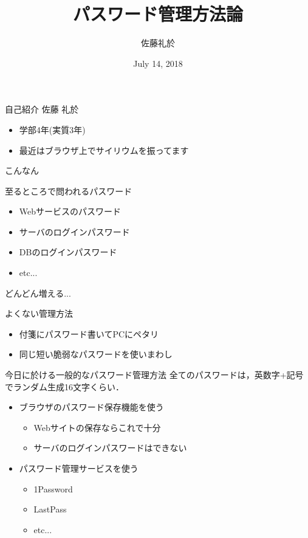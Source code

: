\documentclass{beamer}
\title{パスワード管理方法論}
\author{佐藤礼於}
\date{July 14, 2018}
\begin{document}
\frame{\maketitle}

\begin{frame}{自己紹介}
  \centering \Large 佐藤 礼於

  \begin{itemize}
    \item 学部4年(実質3年)
    \item 最近はブラウザ上でサイリウムを振ってます
  \end{itemize}
\end{frame}

\begin{frame}{こんなん}
\end{frame}


\begin{frame}{至るところで問われるパスワード}
  \begin{itemize}
    \item Webサービスのパスワード
    \item サーバのログインパスワード
    \item DBのログインパスワード
    \item etc...
  \end{itemize}

  どんどん増える...
\end{frame}

\begin{frame}{よくない管理方法}
  \begin{itemize}
    \item 付箋にパスワード書いてPCにペタリ
    \item 同じ短い脆弱なパスワードを使いまわし
  \end{itemize}
\end{frame}

\begin{frame}{今日に於ける一般的なパスワード管理方法}
  全てのパスワードは，英数字+記号でランダム生成16文字くらい．
  \begin{itemize}
    \item ブラウザのパスワード保存機能を使う
      \begin{itemize}
        \item Webサイトの保存ならこれで十分
        \item サーバのログインパスワードはできない
      \end{itemize}
    \item パスワード管理サービスを使う
      \begin{itemize}
        \item 1Password
        \item LastPass
        \item etc...
      \end{itemize}
  \end{itemize}
\end{frame}
\end{document}
